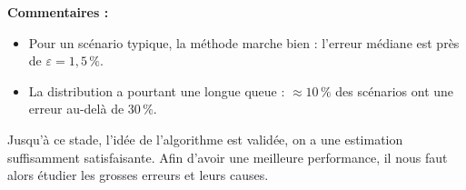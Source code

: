 \textbf{Commentaires : }
\begin{itemize}
    \item Pour un scénario typique, la méthode marche bien : l'erreur
    médiane est près de $\varepsilon = 1{,}5\,\%$.
    \item La distribution a pourtant une longue queue : $\approx 10\,\%$ des
    scénarios ont une erreur au-delà de $30\,\%$.
\end{itemize}
\begin{proposition}
    Jusqu'à ce stade, l'idée de l'algorithme est validée, on a une estimation suffisamment satisfaisante. Afin d'avoir une meilleure performance, il nous faut alors étudier les grosses erreurs et leurs causes.
\end{proposition}

